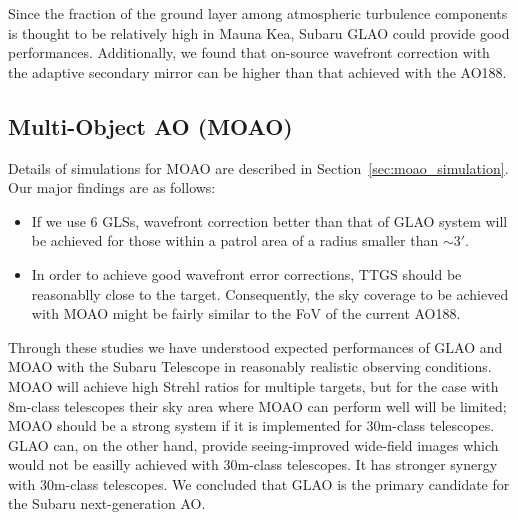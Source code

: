 Since the fraction of the ground layer among atmospheric turbulence
components is thought to be relatively high in Mauna Kea, Subaru GLAO
could provide good performances. Additionally, we found that on-source
wavefront correction with the adaptive secondary mirror can be higher
than that achieved with the AO188.


\subsection{Multi-Object AO (MOAO)}

Details of simulations for MOAO are described in
Section~\ref{sec:moao_simulation}. Our major findings are as follows:

\begin{itemize}
 \setlength{\itemsep}{-3pt}
 \item If we use 6 GLSs, wavefront correction better than that of GLAO
       system will be achieved for those within a patrol area of a
       radius smaller than $\sim 3'$.

 \item In order to achieve good wavefront error corrections, TTGS should
       be reasonablly close to the target. Consequently, the sky
       coverage to be achieved with MOAO might be fairly similar to the
       FoV of the current AO188.
\end{itemize}

\medskip

Through these studies we have understood expected performances of GLAO 
and MOAO with the Subaru Telescope in reasonably realistic observing
conditions. MOAO will achieve high Strehl ratios for multiple targets,
but for the case with 8m-class telescopes their sky area where MOAO can
perform well will be limited; MOAO should be a strong system if it is
implemented for 30m-class telescopes.
GLAO can, on the other hand, provide seeing-improved wide-field images
which would not be easilly achieved with 30m-class telescopes. It has 
stronger synergy with 30m-class telescopes. We concluded that GLAO
is the primary candidate for the Subaru next-generation AO.

\bigskip




